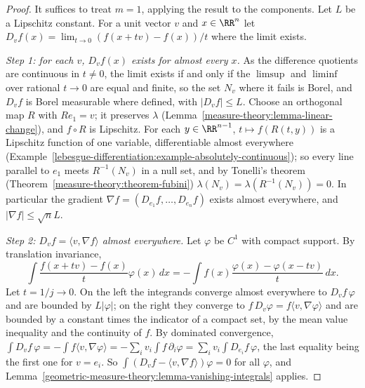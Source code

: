 \begin{proof}
It suffices to treat $m = 1$, applying the result to the components. Let $L$ be a Lipschitz constant. For a unit vector $v$ and $x \in \RR^n$ let
$D_vf(x) = \lim_{t \to 0}(f(x + tv) - f(x))/t$ where the limit exists.

\emph{Step 1: for each $v$, $D_vf(x)$ exists for almost every $x$.} As the difference quotients are continuous in $t \neq 0$, the limit exists if and only if the $\limsup$ and $\liminf$ over
rational $t \to 0$ are equal and finite, so the set $N_v$ where it fails is Borel, and $D_vf$ is Borel measurable where defined, with $|D_vf| \leq L$. Choose an orthogonal map $R$ with $Re_1 = v$;
it preserves $\lambda$ (Lemma~\ref{measure-theory:lemma-linear-change}), and $f \circ R$ is Lipschitz. For each $y \in \RR^{n-1}$, $t \mapsto f(R(t, y))$ is a Lipschitz function of one variable,
differentiable almost everywhere (Example~\ref{lebesgue-differentiation:example-absolutely-continuous}); so every line parallel to $e_1$ meets $R^{-1}(N_v)$ in a null set, and by Tonelli's theorem
(Theorem~\ref{measure-theory:theorem-fubini}) $\lambda(N_v) = \lambda(R^{-1}(N_v)) = 0$. In particular the gradient $\nabla f = (D_{e_1}f, \ldots, D_{e_n}f)$ exists almost everywhere, and
$|\nabla f| \leq \sqrt nL$.

\emph{Step 2: $D_vf = \langle v, \nabla f\rangle$ almost everywhere.} Let $\varphi$ be $C^1$ with compact support. By translation invariance,
\[
\int\frac{f(x + tv) - f(x)}{t}\varphi(x)\,dx = -\int f(x)\frac{\varphi(x) - \varphi(x - tv)}{t}\,dx .
\]
Let $t = 1/j \to 0$. On the left the integrands converge almost everywhere to $D_vf\,\varphi$ and are bounded by $L|\varphi|$; on the right they converge to $f\,D_v\varphi = f\langle v, \nabla\varphi\rangle$
and are bounded by a constant times the indicator of a compact set, by the mean value inequality and the continuity of $f$. By dominated convergence,
$\int D_vf\,\varphi = -\int f\langle v, \nabla\varphi\rangle = -\sum_iv_i\int f\,\partial_i\varphi = \sum_iv_i\int D_{e_i}f\,\varphi$, the last equality being the first one for $v = e_i$. So
$\int(D_vf - \langle v, \nabla f\rangle)\varphi = 0$ for all $\varphi$, and Lemma~\ref{geometric-measure-theory:lemma-vanishing-integrals} applies.


\end{proof}
